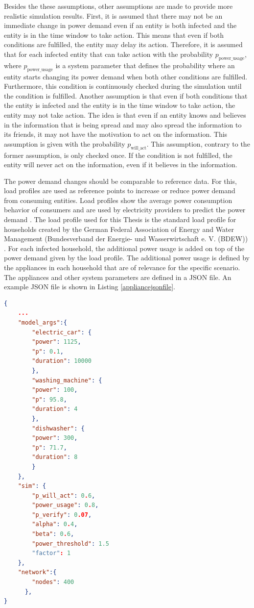 Besides the these assumptions, other assumptions are made 
to provide more realistic simulation results. 
First, it is assumed that there may not be an immediate change 
in power demand even if an entity is both infected and the entity 
is in the time window to take action. This means that even if
both conditions are fulfilled, the entity may delay its action. 
Therefore, it is assumed that for each infected entity that can 
take action with the probability $p_{\mathrm{power\_usage}}$, where 
$p_{\mathrm{power\_usage}}$ is a system
parameter that defines the probability where an entity
starts changing its power demand when both other conditions are
fulfilled. Furthermore, this condition is continuously checked 
during the simulation until the condition is fulfilled.
Another assumption is that even if both conditions that
the entity is infected and the entity is in the time window 
to take action, the entity may not take action.
The idea is that even if an entity knows and believes
in the information that is being spread and may also spread
the information to its friends, it may not have the motivation to 
act on the information.
This assumption is given with the probability $p_{\mathrm{will\_act}}$.
This assumption, contrary to the former assumption, is only
checked once. If the condition is not fulfilled, the 
entity will never act on the information, even if 
it believes in the information.

The power demand changes should be comparable to reference data.
For this, load profiles are used as reference points to increase
or reduce power demand from consuming entities. Load profiles
show the average power consumption behavior of consumers and 
are used by electricity providers to predict the power demand
\cite{proedrou2021comprehensive}.
The load profile used for this Thesis is the standard load profile
for households created by the German Federal Association of Energy and 
Water Management (Bundesverband der Energie- und Wasserwirtschaft 
e. V. (BDEW)) \cite{meier1999reprasentative}.
For each infected household, the additional power usage is 
added on top of the power demand given by the load profile.
The additional power usage is defined by the appliances in each
household that are of relevance for the specific scenario. 
The appliances and other system parameters are defined
in a JSON file. An example JSON file is shown in Listing 
\ref{appliancejsonfile}.

\begin{lstlisting}[language=json,firstnumber=1, 
    caption={Example parameters for household appliances for 
    the simulation},captionpos=b,label={appliancejsonfile}]
{
    ...
    "model_args":{
        "electric_car": {
        "power": 1125,
        "p": 0.1,
        "duration": 10000
        },
        "washing_machine": {
        "power": 100,
        "p": 95.8,
        "duration": 4
        },
        "dishwasher": {
        "power": 300,
        "p": 71.7,
        "duration": 8
        } 
    },
    "sim": {
        "p_will_act": 0.6,
        "power_usage": 0.8,
        "p_verify": 0.07,
        "alpha": 0.4,
        "beta": 0.6,
        "power_threshold": 1.5
        "factor": 1
    },
    "network":{
        "nodes": 400
      }, 
}
\end{lstlisting}

